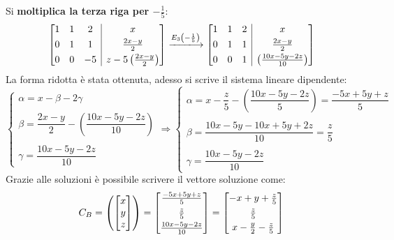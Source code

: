\documentclass[a4paper]{article}
\makeatletter
\newenvironment{rowequmatbra}[1]{\left[\array{@{}#1@{}}}{\endarray\right]}
\makeatother
\begin{document}
	Si \textbf{moltiplica la terza riga per $-\frac{1}{5}$}:
	\begin{equation*}
		\begin{rowequmatbra}{ccc|c}
			1 & 1 & 2 & x \\ [0.3em]
			0 & 1 & 1 & \frac{2x-y}{2} \\ [0.3em]
			0 & 0 & -5 & z-5\left(\frac{2x-y}{2}\right)
		\end{rowequmatbra}
		\xlongrightarrow{E_{3}\left(-\frac{1}{5}\right)}
		\begin{rowequmatbra}{ccc|c}
			1 & 1 & 2 & x \\ [0.3em]
			0 & 1 & 1 & \frac{2x-y}{2} \\ [0.3em]
			0 & 0 & 1 & \left(\frac{10x-5y-2z}{10}\right)
		\end{rowequmatbra}
	\end{equation*}
	La forma ridotta è stata ottenuta, adesso si scrive il sistema lineare dipendente:
	\begin{equation*}
		\begin{cases}
			\alpha = x - \beta - 2\gamma \\
			\\
			\beta = \dfrac{2x-y}{2} - \left(\dfrac{10x-5y-2z}{10}\right) \\
			\\
			\gamma = \dfrac{10x-5y-2z}{10}
		\end{cases} \Longrightarrow
		\begin{cases}
			\alpha = x - \dfrac{z}{5} - \left(\dfrac{10x-5y-2z}{5}\right) = \dfrac{-5x+5y+z}{5}\\
			\\
			\beta = \dfrac{10x-5y-10x+5y+2z}{10} = \dfrac{z}{5} \\
			\\
			\gamma = \dfrac{10x-5y-2z}{10}
		\end{cases}
	\end{equation*}
	Grazie alle soluzioni è possibile scrivere il vettore soluzione come:
	\begin{equation*}
		C_{B} = \left(\begin{bmatrix}
			x \\
			y \\
			z
		\end{bmatrix}\right) = \begin{rowequmatbra}{c}
			\frac{-5x+5y+z}{5} \\ [0.3em]
			\frac{z}{5} \\ [0.3em]
			\frac{10x-5y-2z}{10}
		\end{rowequmatbra} = \begin{rowequmatbra}{c}
			-x+y+\frac{z}{5} \\ [0.3em]
			\frac{z}{5} \\ [0.3em]
			x - \frac{y}{2} - \frac{z}{5}
		\end{rowequmatbra}
	\end{equation*}
\end{document}
